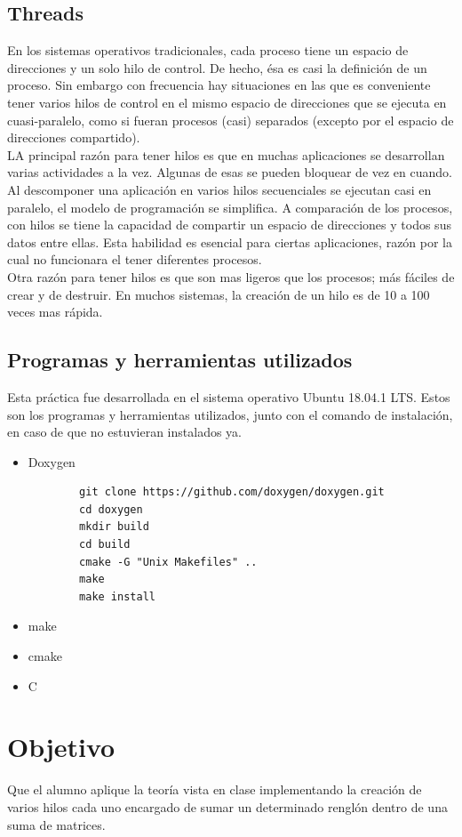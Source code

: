 \documentclass[12pt]{article}
\begin{document}
\subsection{Threads}
En los sistemas operativos tradicionales, cada proceso tiene un espacio de direcciones y un solo hilo de control. De hecho, ésa es casi la definición de un proceso. Sin embargo con frecuencia hay situaciones en las que es conveniente tener varios hilos de control en el mismo espacio de direcciones que se ejecuta en cuasi-paralelo, como si fueran procesos (casi) separados (excepto por el espacio de direcciones compartido). 
\\
LA principal razón para tener hilos es que en muchas aplicaciones se desarrollan varias actividades a la vez. Algunas de esas se pueden bloquear de vez en cuando. Al descomponer una aplicación en varios hilos secuenciales se ejecutan casi en paralelo, el modelo de programación se simplifica. A comparación de los procesos, con hilos se tiene la capacidad de compartir un espacio de direcciones y todos sus datos entre ellas. Esta habilidad es esencial para ciertas aplicaciones, razón por la cual no funcionara el tener diferentes procesos.
\\ 
Otra razón para tener hilos es que son mas ligeros que los procesos; más fáciles de crear y de destruir. En muchos sistemas, la creación de un hilo es de 10 a 100 veces mas rápida. 
\subsection{Programas y herramientas utilizados}
Esta práctica fue desarrollada en el sistema operativo Ubuntu 18.04.1 LTS. Estos son los programas y herramientas utilizados, junto con el comando de instalación, en caso de que no estuvieran instalados ya. 
\begin{itemize}
    \item Doxygen 
    \begin{verbatim}
        git clone https://github.com/doxygen/doxygen.git
        cd doxygen
        mkdir build
        cd build
        cmake -G "Unix Makefiles" ..
        make
        make install
    \end{verbatim}
    \item make
    \item cmake
    \item C
\end{itemize}
\section{Objetivo}
Que el alumno aplique la teoría vista en clase implementando la creación de varios hilos cada uno encargado de sumar un determinado renglón dentro de una suma de matrices.
\end{document}
